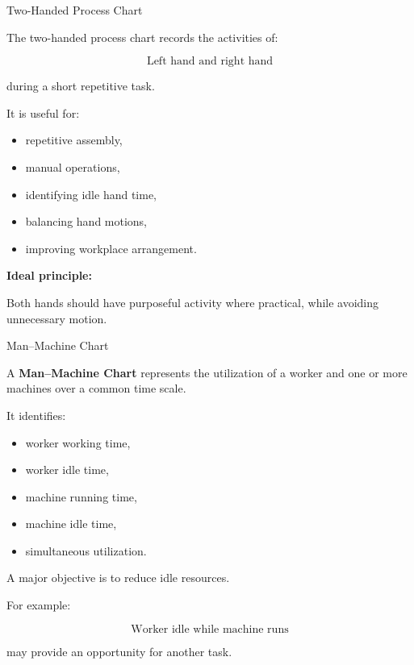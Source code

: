 \documentclass[aspectratio=169,10pt]{beamer}
\begin{document}

\begin{frame}[shrink=18]{Two-Handed Process Chart}
\small

The two-handed process chart records the activities of:

\[
\boxed{\text{Left hand and right hand}}
\]

during a short repetitive task.

\vspace{5pt}

It is useful for:

\begin{itemize}
    \item repetitive assembly,
    \item manual operations,
    \item identifying idle hand time,
    \item balancing hand motions,
    \item improving workplace arrangement.
\end{itemize}

\vspace{5pt}

\textbf{Ideal principle:}

Both hands should have purposeful activity where practical,
while avoiding unnecessary motion.

\end{frame}


\begin{frame}[shrink=18]{Man--Machine Chart}
\small

A \textbf{Man--Machine Chart} represents the utilization of a worker
and one or more machines over a common time scale.

\vspace{5pt}

It identifies:

\begin{itemize}
    \item worker working time,
    \item worker idle time,
    \item machine running time,
    \item machine idle time,
    \item simultaneous utilization.
\end{itemize}

\vspace{5pt}

A major objective is to reduce idle resources.

For example:

\[
\boxed{
\text{Worker idle while machine runs}
}
\]

may provide an opportunity for another task.

\end{frame}
\end{document}
